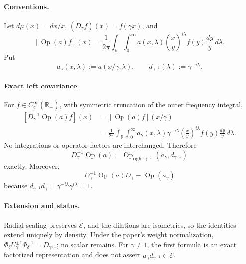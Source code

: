 \paragraph{Conventions.}
Let \(d\mu(x)=dx/x\), \((D_\gamma f)(x)=f(\gamma x)\), and
\[
 [\operatorname{Op}(a)f](x)
 =\frac1{2\pi}\int_{\mathbb R}\int_0^\infty
 a(x,\lambda)\left(\frac{x}{y}\right)^{i\lambda}
 f(y)\frac{dy}{y}\,d\lambda.
\]
Put
\[
 a_\gamma(x,\lambda):=a(x/\gamma,\lambda),
 \qquad d_{\gamma^{-1}}(\lambda):=\gamma^{-i\lambda}.
\]

\paragraph{Exact left covariance.}
For \(f\in C_c^\infty(\mathbb R_+)\), with symmetric truncation of the
outer frequency integral,
\[
\begin{aligned}
 [D_\gamma^{-1}\operatorname{Op}(a)f](x)
 &= [\operatorname{Op}(a)f](x/\gamma)\\
 &=\frac1{2\pi}\int_{\mathbb R}\int_0^\infty
 a_\gamma(x,\lambda)\gamma^{-i\lambda}
 \left(\frac{x}{y}\right)^{i\lambda}
 f(y)\frac{dy}{y}\,d\lambda.
\end{aligned}
\]
No integrations or operator factors are interchanged. Therefore
\[
 \boxed{
 D_\gamma^{-1}\operatorname{Op}(a)
 =\operatorname{Op}_{\mathrm{right}\text{-}\gamma^{-1}}
 (a_\gamma,d_{\gamma^{-1}})
 }
\]
exactly. Moreover,
\[
 \boxed{
 D_\gamma^{-1}\operatorname{Op}(a)D_\gamma
 =\operatorname{Op}(a_\gamma)
 }
\]
because
\(d_{\gamma^{-1}}d_\gamma
=\gamma^{-i\lambda}\gamma^{i\lambda}=1\).

\paragraph{Extension and status.}
Radial scaling preserves \(\widetilde{\mathcal E}\), and the dilations are
isometries, so the identities extend uniquely by density. Under the paper's
weight normalization,
\(\Phi_\delta U_\gamma^{\pm1}\Phi_\delta^{-1}
=D_{\gamma^{\pm1}}\); no scalar remains. For \(\gamma\ne1\), the first
formula is an exact factorized representation and does not assert
\(a_\gamma d_{\gamma^{-1}}\in\widetilde{\mathcal E}\).
